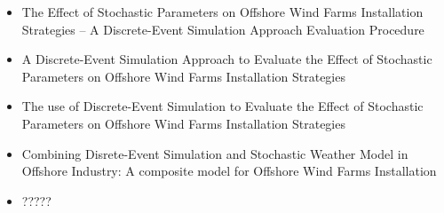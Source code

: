 \begin{titles}
\begin{itemize}
\item The Effect of Stochastic Parameters on Offshore Wind Farms Installation Strategies -- A Discrete-Event Simulation Approach Evaluation Procedure
\item A Discrete-Event Simulation Approach to Evaluate the Effect of Stochastic Parameters on Offshore Wind Farms Installation Strategies
\item The use of Discrete-Event Simulation to Evaluate the Effect of Stochastic Parameters on Offshore Wind Farms Installation Strategies
\item Combining Disrete-Event Simulation and Stochastic Weather Model in Offshore Industry: A composite model for Offshore Wind Farms Installation
\item ?????
\end{itemize}
\end{titles}